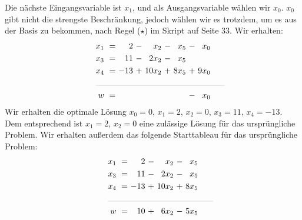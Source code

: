 \documentclass [a4paper,11pt]{article}
\begin{document}
\begin{enumerate}
        Die nächste Eingangsvariable ist $x_1$, und als Ausgangsvariable wählen wir $x_0$. $x_0$ gibt nicht die strengste Beschränkung,
        jedoch wählen wir es trotzdem, um es aus der Basis zu bekommen, nach Regel ($\star$) im Skript auf Seite 33. Wir erhalten:
        \begin{align*}
        \begin{alignedat}{6}
        && x_1 &\ = &\   2 &\ - &\   x_2 &\ - &\  x_5 &\ - &\  x_0 \\
        && x_3 &\ = &\  11 &\ - &   2x_2 &\ - &\  x_5 &    & \\
        && x_4 &\ = &\ -13 &\ + &\ 10x_2 &\ + &\ 8x_5 &\ + &\ 9x_0 \\
        &\rlap{\rule{5.5cm}{.1pt}} &&&&&&&&&\\
        && w   &\ = &      &    &        &    &       &\ - &\ x_0
        \end{alignedat}
        \end{align*}
        Wir erhalten die optimale Lösung $x_0 = 0$, $x_1 = 2$, $x_2 = 0$, $x_3 = 11$, $x_4 = -13$. Dem entsprechend ist $x_1 = 2$, $x_2 = 0$
        eine zulässige Lösung für das ursprüngliche Problem. Wir erhalten außerdem das folgende Starttableau für das ursprüngliche Problem:
        \begin{align*}
        \begin{alignedat}{6}
        && x_1 &\ = &\   2 &\ - &\   x_2 &\ - &\  x_5 \\
        && x_3 &\ = &\  11 &\ - &   2x_2 &\ - &\  x_5 \\
        && x_4 &\ = &\ -13 &\ + &\ 10x_2 &\ + &\ 8x_5 \\
        &\rlap{\rule{4.5cm}{.1pt}} &&&&&&&\\
        && w   &\ = &\  10 &\ + &\  6x_2 &\ - &\ 5x_5
        \end{alignedat}
        \end{align*}
            
    \end{enumerate}
\end{document}
